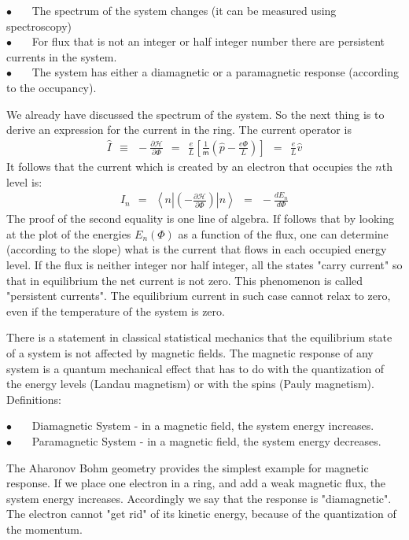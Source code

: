 \documentclass[onecolumn,fleqn]{revtex4}
\newcommand{\mass}{\mathsf{m}}
\newcommand{\bitem}{$\bullet$ \ \ \ }
\newcommand{\beq}{\begin{eqnarray}}
\newcommand{\eeq}{\end{eqnarray}}
\begin{document}
\bitem The spectrum of the system changes 
(it can be measured using spectroscopy) \\
\bitem For flux that is not an integer or half integer number 
there are persistent currents in the system. \\
\bitem The system has either a diamagnetic 
or a paramagnetic response (according to the occupancy). 


We already have discussed the spectrum of the system.
So the next thing is to derive an expression for the 
current in the ring. The current operator is 
\beq
\hat{I}\ \ \equiv \ \  -\frac{\partial \mathcal{H}}{\partial \Phi} 
\ \ = \ \  \frac{e}{L} \left[\frac{1}{\mass}\left(\hat{p}-\frac{e\Phi}{L}\right)\right]
\ \ = \ \  \frac{e}{L}\hat{v} 
\eeq
It follows that the current which is created 
by an electron that occupies the $n$th level is:
\beq
I_n \ \ = \ \
\left\langle  n \left| \left(-\frac{\partial \mathcal{H}}{\partial \Phi}\right) \right| n \right\rangle 
\ \ = \ \  -\frac{d E_n}{d \Phi} 
\eeq
The proof of the second equality is one line of algebra.
If follows that by looking at the plot of the energies ${E_n(\Phi)}$ 
as a function of the flux, one can determine (according to the slope) 
what is the current that flows in each occupied energy level.
If the flux is neither integer nor half integer, 
all the states "carry current" so that in equilibrium 
the net current is not zero. This phenomenon is 
called "persistent currents". The equilibrium current 
in such case cannot relax to zero, 
even if the temperature of the system is zero. 


There is a statement in classical statistical mechanics that 
the equilibrium state of a system is not affected 
by magnetic fields. The magnetic response of any system 
is a quantum mechanical effect that has to do with the quantization 
of the energy levels (Landau magnetism) or with the spins (Pauly magnetism). 
Definitions: 

\bitem Diamagnetic System - in a magnetic field, the system energy increases. \\
\bitem Paramagnetic System - in a magnetic field, the system energy decreases. 

The Aharonov Bohm geometry provides the simplest example 
for magnetic response. If we place one electron in a ring, 
and add a weak magnetic flux, the system energy increases. 
Accordingly we say that the response is "diamagnetic". 
The electron cannot "get rid" of its kinetic energy, 
because of the quantization of the momentum. 
\end{document}
